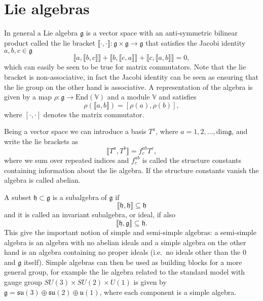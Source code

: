 \section{Lie algebras}
In general a Lie algebra $\mathfrak{g}$ is a vector space with an anti-symmetric bilinear product called the lie bracket $\llbracket\cdot,\cdot\rrbracket: \mathfrak{g}\times\mathfrak{g}\to\mathfrak{g}$ that satisfies the Jacobi identity $a,b,c\in\mathfrak{g}$
\begin{equation}
\llbracket a,\llbracket b,c\rrbracket\rrbracket+\llbracket b,\llbracket c,a\rrbracket\rrbracket+\llbracket c,\llbracket a,b\rrbracket\rrbracket=0, 
\end{equation}
which can easily be seen to be true for matrix commutators. Note that the lie bracket is non-associative, in fact the Jacobi identity can be seen as ensuring that the lie group on the other hand is associative. A representation of the algebra is given by a map $\rho: \mathfrak{g}\to \text{End}(\mathbb{V})$ and a module $\mathbb{V}$ and satisfies
\begin{equation}
    \rho(\llbracket a,b\rrbracket) = [\rho(a),\rho(b)],
\end{equation}
where $[\cdot,\cdot]$ denotes the matrix commutator.

Being a vector space we can introduce a basis $T^a$, where $a=1,2,\ldots,\text{dim}\mathfrak{g}$, and write the lie brackets as 
\begin{equation}
    \llbracket T^a,T^b\rrbracket = f^{ab}_c T^c,
\end{equation}
where we sum over repeated indices and $f^{ab}_c$ is called the structure constants containing information about the lie algebra. If the structure constants vanish the algebra is called abelian.

A subset $\mathfrak{h}\subset \mathfrak{g}$ is a subalgebra of $\mathfrak{g}$ if \begin{equation}
    \llbracket\mathfrak{h},\mathfrak{h}\rrbracket\subseteq \mathfrak{h}
\end{equation} 
and it is called an invariant subalgebra, or ideal, if also
\begin{equation}
    \llbracket\mathfrak{h},\mathfrak{g}\rrbracket\subseteq \mathfrak{h}.
\end{equation}
This give the important notion of simple and semi-simple algebras: a semi-simple algebra is an algebra with no abelian ideals and a simple algebra on the other hand is an algebra containing no proper ideals (i.e.\ no ideals other than the ${0}$ and $\mathfrak{g}$ itself). Simple algebras can then be used as building blocks for a more general group, for example the lie algebra related to the standard model with gauge group $SU(3)\times SU(2)\times U(1)$ is given by $\mathfrak{g}=\mathfrak{su}(3)\oplus\mathfrak{su}(2)\oplus\mathfrak{u}(1)$, where each component is a simple algebra. 

